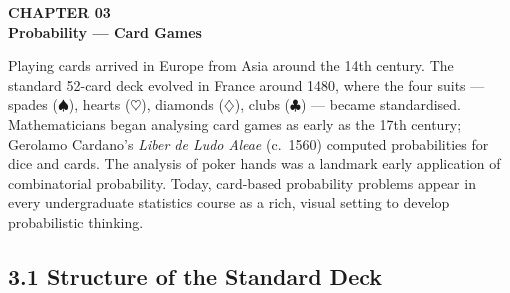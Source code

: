 \documentclass[12pt]{article}
\begin{document}
\newpage

\begin{tcolorbox}[enhanced,arc=0pt,boxrule=0pt,colback=primary,colframe=primary,
  left=16pt,right=16pt,top=14pt,bottom=10pt,borderline south={4pt}{0pt}{accent}]
  {\color{accent!70}\small\bfseries CHAPTER 03}\\[4pt]
  {\LARGE\bfseries\color{white}Probability --- Card Games}
\end{tcolorbox}
\vspace{10pt}

\begin{histbox}
Playing cards arrived in Europe from Asia around the 14th century. The standard 52-card deck evolved in France around 1480, where the four suits --- spades ($\spadesuit$), hearts ($\heartsuit$), diamonds ($\diamondsuit$), clubs ($\clubsuit$) --- became standardised. Mathematicians began analysing card games as early as the 17th century; Gerolamo Cardano's \textit{Liber de Ludo Aleae} (c.\ 1560) computed probabilities for dice and cards. The analysis of poker hands was a landmark early application of combinatorial probability. Today, card-based probability problems appear in every undergraduate statistics course as a rich, visual setting to develop probabilistic thinking.
\end{histbox}

\bigskip

\subsection{3.1 Structure of the Standard Deck}
\end{document}
